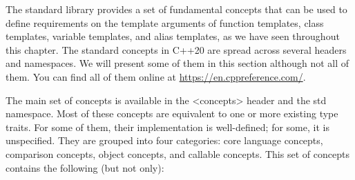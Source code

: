 The standard library provides a set of fundamental concepts that can be used to define requirements on the template arguments of function templates, class templates, variable templates, and alias templates, as we have seen throughout this chapter. The standard concepts in C++20 are spread across several headers and namespaces. We will present some of them in this section although not all of them. You can find all of them online at \url{https://en.cppreference.com/}.

The main set of concepts is available in the <concepts> header and the std namespace. Most of these concepts are equivalent to one or more existing type traits. For some of them, their implementation is well-defined; for some, it is unspecified. They are grouped into four categories: core language concepts, comparison concepts, object concepts, and callable concepts. This set of concepts contains the following (but not only):

